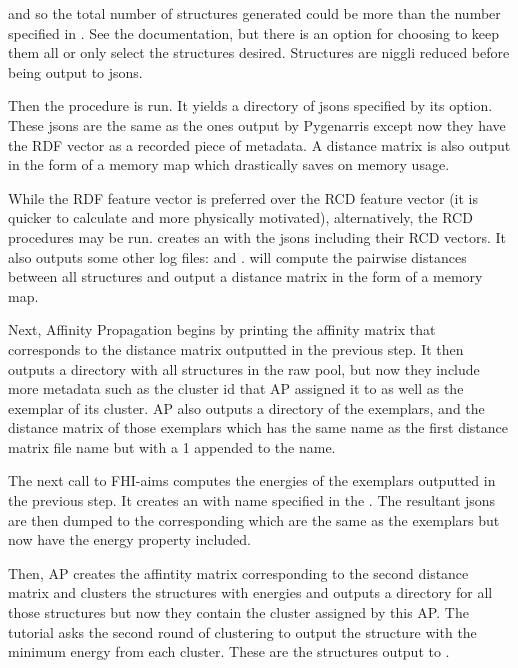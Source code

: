 \documentclass[letterpaper,10pt,english]{sphinxmanual}
\begin{document}
and so the total number of structures generated could
be more than the number specified in . See the documentation, but
there is an option for choosing to keep them all or only select
the  structures desired. Structures are niggli reduced
before being output to jsons.

Then the  procedure is run. It yields a directory of jsons
specified by its  option. These jsons are the same as the
ones output by Pygenarris except now they have the RDF vector as a recorded
piece of metadata. A distance matrix is also output in the form
of a memory map which drastically saves on memory usage.

While the RDF feature vector is preferred over the RCD feature vector (it is
quicker to calculate and more physically motivated), alternatively, the RCD
procedures may be run.  creates an  with the
jsons including their RCD vectors. It also outputs some other log files:
 and . 
will compute the pairwise distances between all structures and output a
distance matrix in the form of a memory map.

Next, Affinity Propagation begins by printing the affinity matrix that
corresponds to the distance matrix outputted in the previous step.
It then outputs a directory with all structures in the raw pool, but now they
include more metadata such as the cluster id that AP assigned
it to as well as the exemplar of its cluster. AP also outputs a directory of
the exemplars, and the distance matrix of those exemplars which has
the same name as the first distance matrix file name but with a 1 appended
to the name.

The next call to FHI-aims computes the energies of the exemplars outputted in
the previous step. It creates an  with name specified in
the . The resultant jsons are then dumped to the corresponding
 which are the same as the exemplars but now have the energy
property included.

Then, AP creates the affintity matrix corresponding to the second distance
matrix and clusters the structures with energies and outputs a directory
for all those structures but now they contain the cluster assigned by this AP.
The tutorial asks the second round of clustering to output the
structure with the minimum energy from each cluster. These are the structures
output to .
\end{document}
